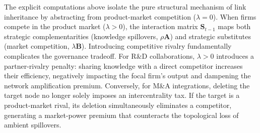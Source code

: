 The explicit computations above isolate the pure structural mechanism of link inheritance by abstracting from product-market competition ($\lambda = 0$). When firms compete in the product market ($\lambda > 0$), the interaction matrix $\mathbf{S}_{t-1}$ maps both strategic complementarities (knowledge spillovers, $\rho\mathbf{A}$) and strategic substitutes (market competition, $\lambda\mathbf{B}$). Introducing competitive rivalry fundamentally complicates the governance tradeoff. For R\&D collaborations, $\lambda > 0$ introduces a partner-rivalry penalty: sharing knowledge with a direct competitor increases their efficiency, negatively impacting the focal firm's output and dampening the network amplification premium. Conversely, for M\&A integrations, deleting the target node no longer solely imposes an intercentrality tax. If the target is a product-market rival, its deletion simultaneously eliminates a competitor, generating a market-power premium that counteracts the topological loss of ambient spillovers.


